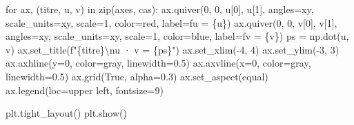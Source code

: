\documentclass[
  french,
  11pt,
  a4paper,
]{scrbook}
\newenvironment{Shaded}{}{}
\newcommand{\BuiltInTok}[1]{\textcolor[rgb]{0.84,0.23,0.29}{#1}}
\newcommand{\CharTok}[1]{\textcolor[rgb]{0.01,0.18,0.38}{#1}}
\newcommand{\ControlFlowTok}[1]{\textcolor[rgb]{0.84,0.23,0.29}{#1}}
\newcommand{\DecValTok}[1]{\textcolor[rgb]{0.00,0.36,0.77}{#1}}
\newcommand{\FloatTok}[1]{\textcolor[rgb]{0.00,0.36,0.77}{#1}}
\newcommand{\KeywordTok}[1]{\textcolor[rgb]{0.84,0.23,0.29}{#1}}
\newcommand{\NormalTok}[1]{\textcolor[rgb]{0.14,0.16,0.18}{#1}}
\newcommand{\OperatorTok}[1]{\textcolor[rgb]{0.14,0.16,0.18}{#1}}
\newcommand{\SpecialCharTok}[1]{\textcolor[rgb]{0.00,0.36,0.77}{#1}}
\newcommand{\SpecialStringTok}[1]{\textcolor[rgb]{0.01,0.18,0.38}{#1}}
\newcommand{\StringTok}[1]{\textcolor[rgb]{0.01,0.18,0.38}{#1}}
\newcommand{\VariableTok}[1]{\textcolor[rgb]{0.89,0.38,0.04}{#1}}
\begin{document}
\begin{Shaded}
\begin{Highlighting}[]
\ControlFlowTok{for}\NormalTok{ ax, (titre, u, v) }\KeywordTok{in} \BuiltInTok{zip}\NormalTok{(axes, cas):}
\NormalTok{    ax.quiver(}\DecValTok{0}\NormalTok{, }\DecValTok{0}\NormalTok{, u[}\DecValTok{0}\NormalTok{], u[}\DecValTok{1}\NormalTok{], angles}\OperatorTok{=}\StringTok{\textquotesingle{}xy\textquotesingle{}}\NormalTok{, scale\_units}\OperatorTok{=}\StringTok{\textquotesingle{}xy\textquotesingle{}}\NormalTok{, scale}\OperatorTok{=}\DecValTok{1}\NormalTok{, }
\NormalTok{              color}\OperatorTok{=}\StringTok{\textquotesingle{}red\textquotesingle{}}\NormalTok{, label}\OperatorTok{=}\SpecialStringTok{f\textquotesingle{}u = }\SpecialCharTok{\{}\NormalTok{u}\SpecialCharTok{\}}\SpecialStringTok{\textquotesingle{}}\NormalTok{)}
\NormalTok{    ax.quiver(}\DecValTok{0}\NormalTok{, }\DecValTok{0}\NormalTok{, v[}\DecValTok{0}\NormalTok{], v[}\DecValTok{1}\NormalTok{], angles}\OperatorTok{=}\StringTok{\textquotesingle{}xy\textquotesingle{}}\NormalTok{, scale\_units}\OperatorTok{=}\StringTok{\textquotesingle{}xy\textquotesingle{}}\NormalTok{, scale}\OperatorTok{=}\DecValTok{1}\NormalTok{, }
\NormalTok{              color}\OperatorTok{=}\StringTok{\textquotesingle{}blue\textquotesingle{}}\NormalTok{, label}\OperatorTok{=}\SpecialStringTok{f\textquotesingle{}v = }\SpecialCharTok{\{}\NormalTok{v}\SpecialCharTok{\}}\SpecialStringTok{\textquotesingle{}}\NormalTok{)}
\NormalTok{    ps }\OperatorTok{=}\NormalTok{ np.dot(u, v)}
\NormalTok{    ax.set\_title(}\SpecialStringTok{f"}\SpecialCharTok{\{}\NormalTok{titre}\SpecialCharTok{\}}\CharTok{\textbackslash{}n}\SpecialStringTok{u · v = }\SpecialCharTok{\{}\NormalTok{ps}\SpecialCharTok{\}}\SpecialStringTok{"}\NormalTok{)}
\NormalTok{    ax.set\_xlim(}\OperatorTok{{-}}\DecValTok{4}\NormalTok{, }\DecValTok{4}\NormalTok{)}
\NormalTok{    ax.set\_ylim(}\OperatorTok{{-}}\DecValTok{3}\NormalTok{, }\DecValTok{3}\NormalTok{)}
\NormalTok{    ax.axhline(y}\OperatorTok{=}\DecValTok{0}\NormalTok{, color}\OperatorTok{=}\StringTok{\textquotesingle{}gray\textquotesingle{}}\NormalTok{, linewidth}\OperatorTok{=}\FloatTok{0.5}\NormalTok{)}
\NormalTok{    ax.axvline(x}\OperatorTok{=}\DecValTok{0}\NormalTok{, color}\OperatorTok{=}\StringTok{\textquotesingle{}gray\textquotesingle{}}\NormalTok{, linewidth}\OperatorTok{=}\FloatTok{0.5}\NormalTok{)}
\NormalTok{    ax.grid(}\VariableTok{True}\NormalTok{, alpha}\OperatorTok{=}\FloatTok{0.3}\NormalTok{)}
\NormalTok{    ax.set\_aspect(}\StringTok{\textquotesingle{}equal\textquotesingle{}}\NormalTok{)}
\NormalTok{    ax.legend(loc}\OperatorTok{=}\StringTok{\textquotesingle{}upper left\textquotesingle{}}\NormalTok{, fontsize}\OperatorTok{=}\DecValTok{9}\NormalTok{)}

\NormalTok{plt.tight\_layout()}
\NormalTok{plt.show()}
\end{Highlighting}
\end{Shaded}
\end{document}
